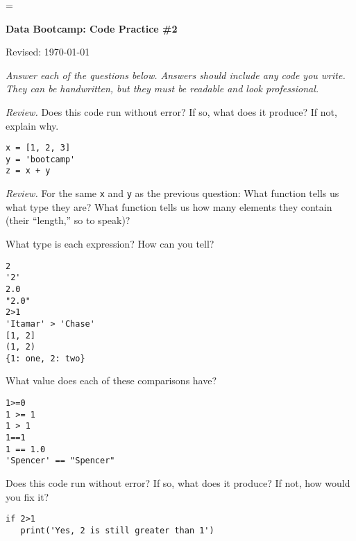 \documentclass[11pt]{exam}
\begin{document}
\parskip=\bigskipamount
\parindent=0.0in
\thispagestyle{empty}


\bigskip\bigskip
\centerline{\Large \bf Data Bootcamp:  Code Practice \#2}
\centerline{Revised: \today}

{\it Answer each of the questions below.
Answers should include any code you write.
They can be handwritten, but they must be readable and look professional.}

\begin{questions}

\item {\it Review.\/} Does this code run without error? If so, what does it produce?  If not, explain why.
\begin{verbatim}
x = [1, 2, 3]
y = 'bootcamp'
z = x + y
\end{verbatim}

\item {\it Review.\/} For the same {\tt x} and {\tt y} as the previous question:
What function tells us what type they are?
What function tells us how many elements they contain
(their ``length,'' so to speak)?



\item What type is each expression?  How can you tell?
\begin{verbatim}
2
'2'
2.0
"2.0"
2>1
'Itamar' > 'Chase'
[1, 2]
(1, 2)
{1: one, 2: two}
\end{verbatim}

\item What value does each of these comparisons have?
\begin{verbatim}
1>=0
1 >= 1
1 > 1
1==1
1 == 1.0
'Spencer' == "Spencer"
\end{verbatim}

\item  Does this code run without error?  If so, what does it produce?  If not, how would you fix it?
\begin{verbatim}
if 2>1
   print('Yes, 2 is still greater than 1')
\end{verbatim}


\end{questions}
\end{document}
